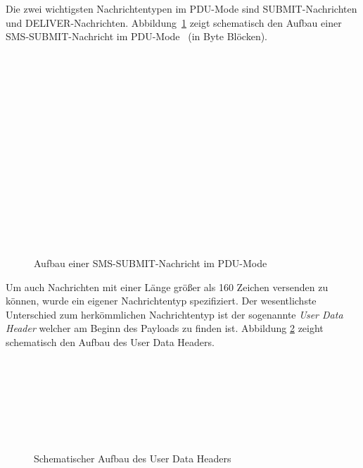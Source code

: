 \documentclass[paper=a4, fontsize=11pt]{scrartcl}
\begin{document}
Die zwei wichtigsten Nachrichtentypen im PDU-Mode sind SUBMIT-Nachrichten und DELIVER-Nachrichten.
Abbildung~\ref{fig:pdu} zeigt schematisch den Aufbau einer SMS-SUBMIT-Nachricht im PDU-Mode~\cite{pdu-mode} (in Byte Blöcken).
\begin{figure}[H]
	\begin{bytefield}[bitwidth=\textwidth/8]{8}
		\\
		\\
		\\
		\\
		\\
		 \\
		\skippedwords \\
		 \\
		\\
		\\
		\\
		 \\
		\skippedwords \\
		 \\
	\end{bytefield}
	\caption{Aufbau einer SMS-SUBMIT-Nachricht im PDU-Mode}
	\label{fig:pdu}
\end{figure}

Um auch Nachrichten mit einer Länge größer als 160 Zeichen versenden zu können, 
wurde ein eigener Nachrichtentyp spezifiziert. Der wesentlichste Unterschied zum
herkömmlichen Nachrichtentyp ist der sogenannte \textit{User Data Header} welcher am
Beginn des Payloads zu finden ist. Abbildung \ref{fig:gsm-udh} zeight schematisch den
Aufbau des User Data Headers.\\
\begin{figure}[H]
	\begin{bytefield}[bitwidth=\textwidth/8]{8}
		 \\
		 \\
		 \\
		 \\
		 \\
		 \\
	\end{bytefield}
	\caption{Schematischer Aufbau des User Data Headers}
	\label{fig:gsm-udh}
\end{figure}
\end{document}

